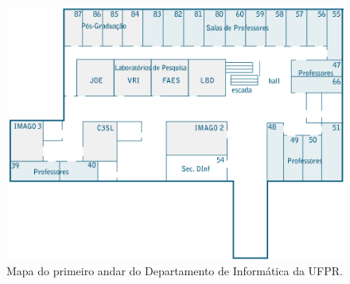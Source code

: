    \begin{figure}[hbt]
  \centering
  \includegraphics[scale=0.9]{images/mapadinf_andar1_492x327.png}
  \caption{Mapa do primeiro andar do Departamento de Informática da UFPR.}
  \label{fig:mapaDinf}
  \end{figure}

    


